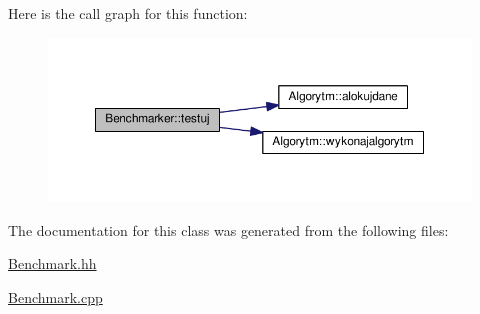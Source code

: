 Here is the call graph for this function\+:
\nopagebreak
\begin{figure}[H]
\begin{center}
\leavevmode
\includegraphics[width=350pt]{a00009_aeecfb553991fc29bbf58420d0c019c1e_cgraph}
\end{center}
\end{figure}




The documentation for this class was generated from the following files\+:\begin{DoxyCompactItemize}
\item 
\hyperlink{a00034}{Benchmark.\+hh}\item 
\hyperlink{a00033}{Benchmark.\+cpp}\end{DoxyCompactItemize}
